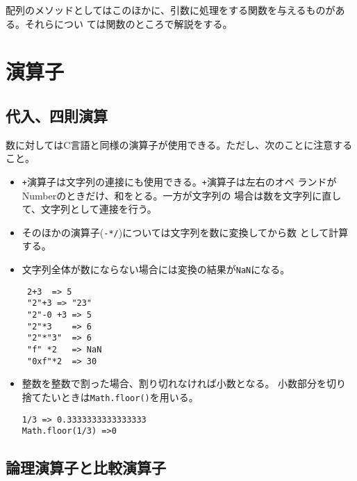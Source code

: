 配列のメソッドとしてはこのほかに、引数に処理をする関数を与えるものがある。それらについ
ては関数のところで解説をする。

\section{演算子}\label{operator}
\subsection{代入、四則演算}
数に対してはC言語と同様の演算子が使用できる。ただし、次のことに注意する
こと。
\begin{itemize}
 \item \Verb-+-演算子は文字列の連接にも使用できる。\Verb-+-演算子は左右のオペ
ランドがNumberのときだけ、和をとる。一方が文字列の
場合は数を文字列に直して、文字列として連接を行う。
 \item そのほかの演算子(\Verb+-*/+)については文字列を数に変換してから数
       として計算する。
 \item 文字列全体が数にならない場合には変換の結果が\Verb+NaN+になる。
\begin{Verbatim}
 2+3  => 5
 "2"+3 => "23"
 "2"-0 +3 => 5
 "2"*3    => 6
 "2"*"3"  => 6
 "f" *2   => NaN
 "0xf"*2  => 30
\end{Verbatim}
 \item 整数を整数で割った場合、割り切れなければ小数となる。
       小数部分を切り捨てたいときは\Verb+Math.floor()+を用いる。
\begin{Verbatim}
1/3 => 0.3333333333333333
Math.floor(1/3) =>0
\end{Verbatim}
\end{itemize}
\subsection{論理演算子と比較演算子}
